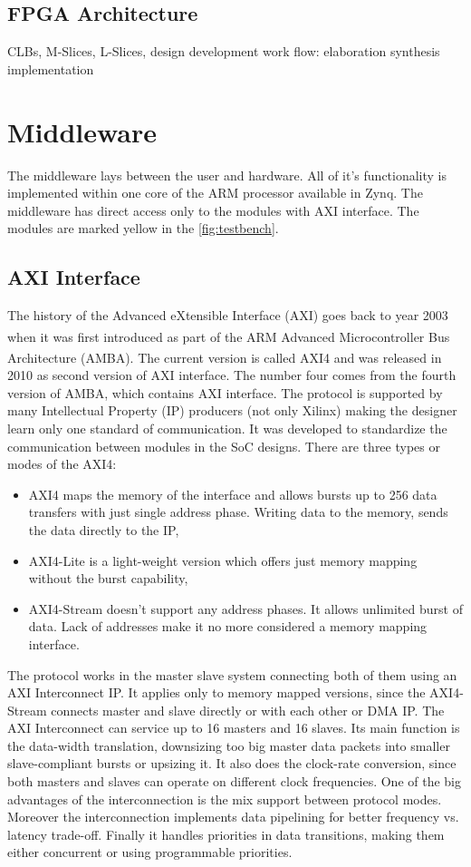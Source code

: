 \subsection{FPGA Architecture}
CLBs, M-Slices, L-Slices, 
design development work flow:
elaboration
synthesis
implementation
\section{Middleware}
The middleware lays between the user and hardware. All of it's functionality is implemented within one core of the ARM processor available in Zynq. The middleware has direct access only to the modules with AXI interface. The modules are marked yellow in the \autoref{fig:testbench}.

\subsection{AXI Interface}
The history of the Advanced eXtensible Interface (AXI) goes back to year 2003 when it was first introduced as part of the ARM\textsuperscript{\textregistered} Advanced Microcontroller Bus Architecture (AMBA\textsuperscript{\textregistered}). The current version is called AXI4 and was released in 2010 as second version of AXI interface. The number four comes from the fourth version of AMBA, which contains AXI interface. The protocol is supported by many Intellectual Property (IP) producers (not only Xilinx) making the designer learn only one standard of communication. It was developed to standardize the communication between modules in the SoC designs. There are three types or modes of the AXI4:
\begin{itemize}
    \item AXI4 maps the memory of the interface and allows bursts up to 256 data transfers with just single address phase. Writing data to the memory, sends the data directly to the IP,
    \item AXI4-Lite is a light-weight version which offers just memory mapping without the burst capability,
    \item AXI4-Stream doesn't support any address phases. It allows unlimited burst of data. Lack of addresses make it no more considered a memory mapping interface.
\end{itemize}
The protocol works in the master slave system connecting both of them using an AXI Interconnect IP. It applies only to memory mapped versions, since the AXI4-Stream connects master and slave directly or with each other or DMA IP. The AXI Interconnect can service up to 16 masters and 16 slaves. Its main function is the data-width translation, downsizing too big master data packets into smaller slave-compliant bursts or upsizing it. It also does the clock-rate conversion, since both masters and slaves can operate on different clock frequencies. One of the big advantages of the interconnection is the mix support between protocol modes. Moreover the interconnection implements data pipelining for better frequency vs. latency trade-off. Finally it handles priorities in data transitions, making them either concurrent or using programmable priorities.
